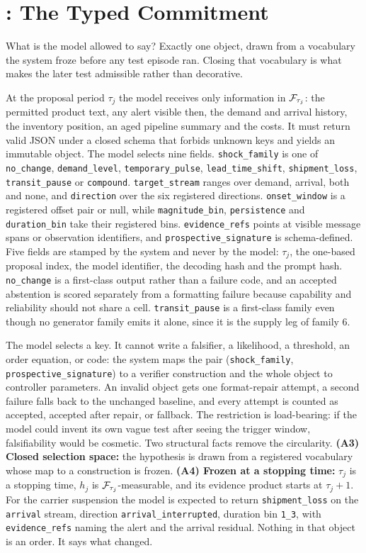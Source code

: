 \section{\shockspec{}: The Typed Commitment}
\label{sec:spec}

What is the model allowed to say? Exactly one object, drawn from a vocabulary the
system froze before any test episode ran. Closing that vocabulary is what makes
the later test admissible rather than decorative.

At the proposal period $\tau_j$ the model receives only information in
$\mathcal{F}_{\tau_j}$: the permitted product text, any alert visible then, the demand
and arrival history, the inventory position, an aged pipeline summary and the
costs. It must return valid JSON under a closed schema that
forbids unknown keys and yields an immutable object. The model selects nine
fields. \texttt{shock\_family} is one of \texttt{no\_change},
\texttt{demand\_level}, \texttt{temporary\_pulse}, \texttt{lead\_time\_shift},
\texttt{shipment\_loss}, \texttt{transit\_pause} or \texttt{compound}.
\texttt{target\_stream} ranges over demand, arrival, both and none, and
\texttt{direction} over the six registered directions. \texttt{onset\_window} is
a registered offset pair or null, while \texttt{magnitude\_bin},
\texttt{persistence} and \texttt{duration\_bin} take their registered bins.
\texttt{evidence\_refs} points at visible message spans or observation
identifiers, and \texttt{prospective\_signature} is schema-defined. Five fields
are stamped by the system and never by the model:
$\tau_j$, the one-based proposal index, the model identifier, the decoding hash
and the prompt hash. \texttt{no\_change} is a first-class output rather than a
failure code, and an accepted abstention is scored separately from a formatting
failure because capability and reliability should not share a cell.
\texttt{transit\_pause} is a first-class family even though no generator family
emits it alone, since it is the supply leg of family 6.

The model selects a key. It cannot write a falsifier, a likelihood, a threshold,
an order equation, or code: the system maps the pair (\texttt{shock\_family},
\texttt{prospective\_signature}) to a verifier construction and the whole object
to controller parameters. An invalid object gets one format-repair attempt, a
second failure falls back to the unchanged baseline, and every attempt is counted
as accepted, accepted after repair, or fallback. The restriction is load-bearing:
if the model could invent its own vague test after seeing the trigger window,
falsifiability would be cosmetic. Two structural facts remove the
circularity. \textbf{(A3) Closed selection space:} the hypothesis is drawn from a
registered vocabulary whose map to a construction is frozen. \textbf{(A4) Frozen
at a stopping time:} $\tau_j$ is a stopping time, $h_j$ is
$\mathcal{F}_{\tau_j}$-measurable, and its evidence product starts at $\tau_j + 1$. For
the carrier suspension the model is expected to return \texttt{shipment\_loss} on
the \texttt{arrival} stream, direction \texttt{arrival\_interrupted}, duration bin
\texttt{1\_3}, with \texttt{evidence\_refs} naming the alert and the arrival
residual. Nothing in that object is an order. It says what changed.
